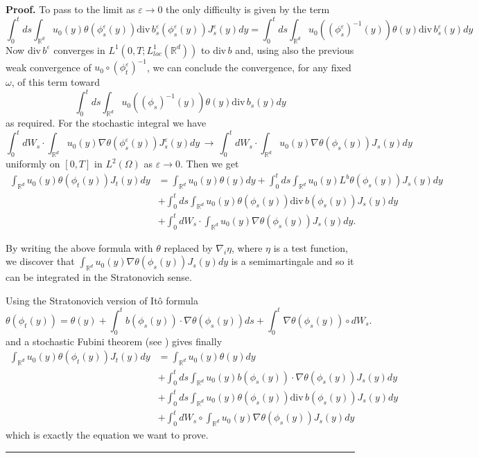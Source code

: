 \documentclass[a4paper,10pt]{article}
\newenvironment{proof}[1][Proof]{\textbf{#1.} }{\ \rule{0.5em}{0.5em}}
\begin{document}
\begin{proof}
To pass to the limit  as $\varepsilon \to 0$ the only difficulty
is given by the term
$$
\int_{0}^{t}ds\int_{{\mathbb{R}}^{d}}u_{0}(y)\theta(\phi_{s}^\varepsilon
(y)){\mathrm{div}\, }b^\varepsilon_s
(\phi_{s}^\varepsilon(y))J_{s}^\varepsilon(y)dy =
\int_{0}^{t}ds\int_{{\mathbb{R}}^{d}}u_{0}((\phi_{s}^\varepsilon)^{-1}
(y))\theta(y){\mathrm{div}\, }b^\varepsilon_s (y)dy
$$
Now ${\mathrm{div}\, }b^\varepsilon$ converges in  $
L_{}^{1}\left( 0,T; L^1_{loc}(\mathbb{R}^d)\right)$ to
${\mathrm{div}\, }b$
  and, using also the previous weak convergence of
 $u_0 \circ (\phi^\varepsilon_t)^{-1}$,
  we can conclude the convergence, for any fixed $\omega$,
   of this term toward
$$
\int_{0}^{t}ds\int_{{\mathbb{R}}^{d}}u_{0}((\phi_{s})^{-1}
(y))\theta(y){\mathrm{div}\, }b_s (y)dy
$$
as required. For the stochastic integral we have
 $$
\int_{0}^{t}dW_{s}\cdot\int_{{\mathbb{R}}^{d}}u_{0}(y)\nabla\theta
(\phi_{s}^\varepsilon(y))J_{s}^\varepsilon(y)dy \, \to \,
 \int_{0}^{t}dW_{s}\cdot\int_{{\mathbb{R}}^{d}}u_{0}(y)\nabla\theta
(\phi_{s}(y))J_{s}(y)dy
 $$
uniformly on $[0,T]$ in $L^2 (\Omega)$ as $\varepsilon \to 0$.
Then we get
\[%
\begin{split}
\int_{{\mathbb{R}}^{d}}u_{0}(y)\theta(\phi_{t}(y))J_{t}(y)dy  &
=\int_{{\mathbb{R}}^{d}}u_{0}(y)\theta(y)dy+\int_{0}^{t}ds\int_{{\mathbb{R}%
}^{d}}u_{0}(y)L^{b}\theta(\phi_{s}(y))J_{s}(y)dy\\
&  +\int_{0}^{t}ds\int_{{\mathbb{R}}^{d}}u_{0}(y)\theta(\phi_{s}%
(y)){\mathrm{div}\,}b(\phi_{s}(y))J_{s}(y)dy\\
&  +\int_{0}^{t}dW_{s}\cdot\int_{{\mathbb{R}}^{d}}u_{0}(y)\nabla\theta
(\phi_{s}(y))J_{s}(y)dy.
\end{split}
\]

By writing the above formula with $\theta$ replaced by $\nabla_{i}\eta$, where
$\eta$ is a test function, we discover that $\int_{{\mathbb{R}}^{d}}%
u_{0}(y)\nabla\theta(\phi_{s}(y))J_{s}(y)dy$ is a semimartingale and so it can
be integrated in the Stratonovich sense.

Using the Stratonovich version of It\^{o} formula
\[
\theta(\phi_{t}(y))=\theta(y)+\int_{0}^{t}b(\phi_{s}(y))\cdot\nabla\theta
(\phi_{s}(y))ds+\int_{0}^{t}\nabla\theta(\phi_{s}(y))\circ dW_{s}.
\]
and a stochastic Fubini theorem (see \cite{IW}) gives finally
\[%
\begin{split}
\int_{{\mathbb{R}}^{d}}u_{0}(y)\theta(\phi_{t}(y))J_{t}(y)dy  &
=\int_{{\mathbb{R}}^{d}}u_{0}(y)\theta(y)dy\\ & +\int_{0}^{t}ds\int_{{\mathbb{R}%
}^{d}}u_{0}(y)b(\phi_{s}(y))\cdot\nabla\theta(\phi_{s}(y))J_{s}(y)dy\\
&  +\int_{0}^{t}ds\int_{{\mathbb{R}}^{d}}u_{0}(y)\theta(\phi_{s}%
(y)){\mathrm{div}\,}b(\phi_{s}(y))J_{s}(y)dy\\
&  +\int_{0}^{t}dW_{s}\circ\int_{{\mathbb{R}}^{d}}u_{0}(y)\nabla\theta
(\phi_{s}(y))J_{s}(y)dy
\end{split}
\]
which is exactly the equation we want to prove.
\end{proof}
\end{document}
